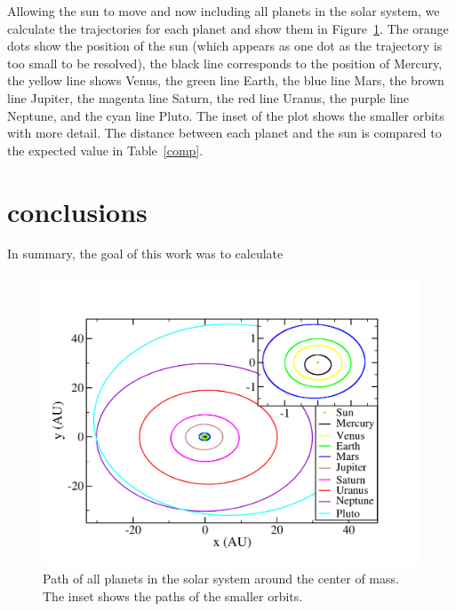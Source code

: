 \documentclass[prc,amsmath,twocolumn,superscriptaddress]{revtex4}
\begin{document}
Allowing the sun to move and now including all planets in the solar system, we calculate the trajectories for each planet and show them in Figure~\ref{all}. The orange dots show the position of the sun (which appears as one dot as the trajectory is too small to be resolved), the black line corresponds to the position of Mercury, the yellow line shows Venus, the green line Earth, the blue line Mars, the brown line Jupiter, the magenta line Saturn, the red line Uranus, the purple line Neptune, and the cyan line Pluto. The inset of the plot shows the smaller orbits with more detail. The distance between each planet and the sun is compared to the expected value in Table~\ref{comp}.

\section{conclusions}
\label{conc}

In summary, the goal of this work was to calculate %

\begin{figure}[h]
\includegraphics[scale=0.33]{all2.pdf}
\caption{Path of all planets in the solar system around the center of mass. The inset shows the paths of the smaller orbits.}
\label{all}
\end{figure}
\end{document}
